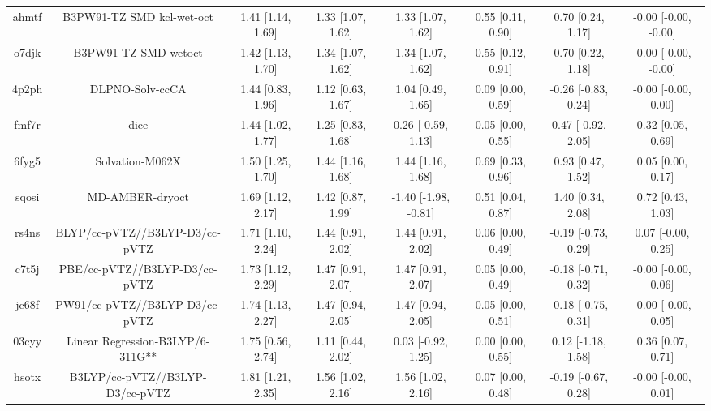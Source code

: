 \documentclass{article}
\begin{document}
\begin{center}
\begin{longtable}{|cccccccc|}
 ahmtf &                          B3PW91-TZ SMD kcl-wet-oct &  1.41 [1.14, 1.69] &  1.33 [1.07, 1.62] &     1.33 [1.07, 1.62] &  0.55 [0.11, 0.90] &    0.70 [0.24, 1.17] &  -0.00 [-0.00, -0.00] \\
 o7djk &                               B3PW91-TZ SMD wetoct &  1.42 [1.13, 1.70] &  1.34 [1.07, 1.62] &     1.34 [1.07, 1.62] &  0.55 [0.12, 0.91] &    0.70 [0.22, 1.18] &  -0.00 [-0.00, -0.00] \\
 4p2ph &                                    DLPNO-Solv-ccCA &  1.44 [0.83, 1.96] &  1.12 [0.63, 1.67] &     1.04 [0.49, 1.65] &  0.09 [0.00, 0.59] &  -0.26 [-0.83, 0.24] &   -0.00 [-0.00, 0.00] \\
 fmf7r &                                               dice &  1.44 [1.02, 1.77] &  1.25 [0.83, 1.68] &    0.26 [-0.59, 1.13] &  0.05 [0.00, 0.55] &   0.47 [-0.92, 2.05] &     0.32 [0.05, 0.69] \\
 6fyg5 &                                    Solvation-M062X &  1.50 [1.25, 1.70] &  1.44 [1.16, 1.68] &     1.44 [1.16, 1.68] &  0.69 [0.33, 0.96] &    0.93 [0.47, 1.52] &     0.05 [0.00, 0.17] \\
 sqosi &                                    MD-AMBER-dryoct &  1.69 [1.12, 2.17] &  1.42 [0.87, 1.99] &  -1.40 [-1.98, -0.81] &  0.51 [0.04, 0.87] &    1.40 [0.34, 2.08] &     0.72 [0.43, 1.03] \\
 rs4ns &                     BLYP/cc-pVTZ//B3LYP-D3/cc-pVTZ &  1.71 [1.10, 2.24] &  1.44 [0.91, 2.02] &     1.44 [0.91, 2.02] &  0.06 [0.00, 0.49] &  -0.19 [-0.73, 0.29] &    0.07 [-0.00, 0.25] \\
 c7t5j &                      PBE/cc-pVTZ//B3LYP-D3/cc-pVTZ &  1.73 [1.12, 2.29] &  1.47 [0.91, 2.07] &     1.47 [0.91, 2.07] &  0.05 [0.00, 0.49] &  -0.18 [-0.71, 0.32] &   -0.00 [-0.00, 0.06] \\
 jc68f &                     PW91/cc-pVTZ//B3LYP-D3/cc-pVTZ &  1.74 [1.13, 2.27] &  1.47 [0.94, 2.05] &     1.47 [0.94, 2.05] &  0.05 [0.00, 0.51] &  -0.18 [-0.75, 0.31] &   -0.00 [-0.00, 0.05] \\
 03cyy &                   Linear Regression-B3LYP/6-311G** &  1.75 [0.56, 2.74] &  1.11 [0.44, 2.02] &    0.03 [-0.92, 1.25] &  0.00 [0.00, 0.55] &   0.12 [-1.18, 1.58] &     0.36 [0.07, 0.71] \\
 hsotx &                    B3LYP/cc-pVTZ//B3LYP-D3/cc-pVTZ &  1.81 [1.21, 2.35] &  1.56 [1.02, 2.16] &     1.56 [1.02, 2.16] &  0.07 [0.00, 0.48] &  -0.19 [-0.67, 0.28] &   -0.00 [-0.00, 0.01] \\

\end{longtable}
\end{center}
\end{document}
